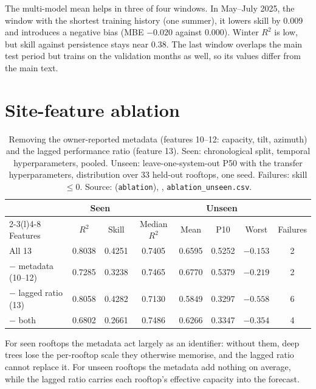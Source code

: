 The multi-model mean helps in three of four windows. In May--July 2025, the window with the shortest training history (one summer), it lowers skill by 0.009 and introduces a negative bias (MBE $-0.020$ against $0.000$). Winter $R^2$ is low, but skill against persistence stays near 0.38. The last window overlaps the main test period but trains on the validation months as well, so its values differ from the main text.

\section{Site-feature ablation}
\label{sec:s-ablation}

\begin{table}[H]
\centering
\caption{Removing the owner-reported metadata (features 10--12: capacity, tilt, azimuth) and the lagged performance ratio (feature 13). Seen: chronological split, temporal hyperparameters, pooled. Unseen: leave-one-system-out P50 with the transfer hyperparameters, distribution over 33 held-out rooftops, one seed. Failures: skill $\le 0$. Source:  (\texttt{ablation}), , \texttt{ablation\_unseen.csv}.}
\label{tab:s-ablation}
\small
\begin{tabularx}{\textwidth}{@{}X c c c c c c c@{}}
\toprule
 & \multicolumn{2}{c}{Seen} & \multicolumn{5}{c}{Unseen} \\
\cmidrule(lr){2-3}\cmidrule(l){4-8}
Features & $R^2$ & Skill & Median $R^2$ & Mean & P10 & Worst & Failures \\
\midrule
All 13 & 0.8038 & 0.4251 & 0.7405 & 0.6595 & 0.5252 & $-0.153$ & 2 \\
$-$ metadata (10--12) & 0.7285 & 0.3238 & 0.7465 & 0.6770 & 0.5379 & $-0.219$ & 2 \\
$-$ lagged ratio (13) & 0.8058 & 0.4282 & 0.7130 & 0.5849 & 0.3297 & $-0.558$ & 6 \\
$-$ both & 0.6802 & 0.2661 & 0.7486 & 0.6266 & 0.3347 & $-0.354$ & 4 \\
\bottomrule
\end{tabularx}
\end{table}

For seen rooftops the metadata act largely as an identifier: without them, deep trees lose the per-rooftop scale they otherwise memorise, and the lagged ratio cannot replace it. For unseen rooftops the metadata add nothing on average, while the lagged ratio carries each rooftop's effective capacity into the forecast.

